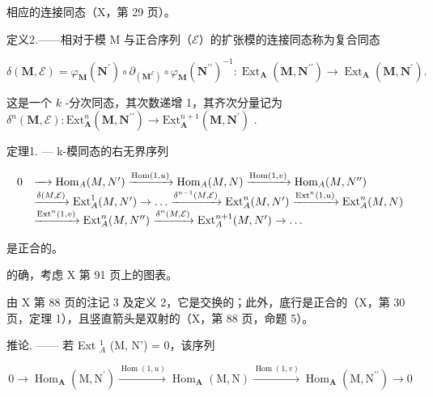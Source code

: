 相应的连接同态（X，第 29 页）。

定义2.——相对于模 M 与正合序列（\(\mathcal{E}\)）的扩张模的连接同态称为复合同态

\[
\delta (\mathbf {M}, \mathcal {E}) = \varphi_ {\mathbf {M}} (\mathbf {N} ^ {\prime}) \circ \partial_ {(\mathbf {M} ^ {\mathcal {E}})} \circ \varphi_ {\mathbf {M}} (\mathbf {N} ^ {\prime \prime}) ^ {- 1}: \operatorname{Ext} _ {\mathbf {A}} (\mathbf {M}, \mathbf {N} ^ {\prime \prime}) \rightarrow \operatorname{Ext} _ {\mathbf {A}} (\mathbf {M}, \mathbf {N} ^ {\prime}).
\]

这是一个 \(k\) -分次同态，其次数递增 1，其齐次分量记为 \(\delta^n (\mathbf{M},\mathcal{E})\colon \mathrm{Ext}_{\mathbf{A}}^{n}(\mathbf{M},\mathbf{N}^{\prime \prime})\to \mathrm{Ext}_{\mathbf{A}}^{n + 1}(\mathbf{M},\mathbf{N}^{\prime})\) .

定理1. --- k-模同态的右无界序列

\[
\begin{array}{r l} 0 & \xrightarrow {\quad} \mathrm{Hom} _ {A} (M, N ^ {\prime}) \xrightarrow {\mathrm{Hom} (1 , u)} \mathrm{Hom} _ {A} (M, N) \xrightarrow {\mathrm{Hom} (1 , v)} \mathrm{Hom} _ {A} (M, N ^ {\prime \prime}) \\ & \xrightarrow {\delta (M , \mathcal {E})} \mathrm{Ext} _ {A} ^ {1} (M, N ^ {\prime}) \to \dots \xrightarrow {\delta^ {n - 1} (M , \mathcal {E})} \mathrm{Ext} _ {A} ^ {n} (M, N ^ {\prime}) \xrightarrow {\mathrm{Ext} ^ {n} (1 , u)} \mathrm{Ext} _ {A} ^ {n} (M, N) \\ & \xrightarrow {\mathrm{Ext} ^ {n} (1 , v)} \mathrm{Ext} _ {A} ^ {n} (M, N ^ {\prime \prime}) \xrightarrow {\delta^ {n} (M , \mathcal {E})} \mathrm{Ext} _ {A} ^ {n + 1} (M, N ^ {\prime}) \to \dots \end{array}
\]

是正合的。

的确，考虑 X 第 91 页上的图表。

由 X 第 88 页的注记 3 及定义 2，它是交换的；此外，底行是正合的（X，第 30 页，定理 1），且竖直箭头是双射的（X，第 88 页，命题 5）。

推论. —— 若 Ext \(_{A}^{1}\) (M, N') = 0，该序列

\[
0 \longrightarrow \operatorname{Hom} _ {\mathbf {A}} (\mathrm{M}, \mathrm{N} ^ {\prime}) \xrightarrow {\operatorname{Hom} (1 , u)} \operatorname{Hom} _ {\mathbf {A}} (\mathrm{M}, \mathrm{N}) \xrightarrow {\operatorname{Hom} (1 , v)} \operatorname{Hom} _ {\mathbf {A}} (\mathrm{M}, \mathrm{N} ^ {\prime \prime}) \longrightarrow 0
\]

